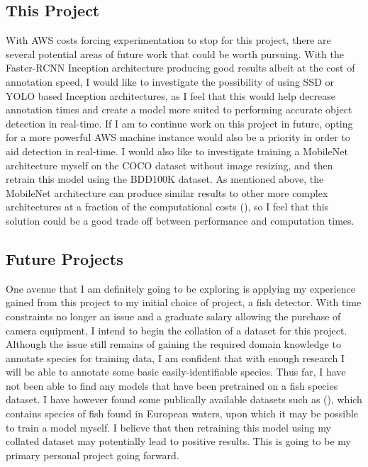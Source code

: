 \documentclass[12pt]{report}
\begin{document}
\subsection*{This Project}
\begin{flushleft}
With AWS costs forcing experimentation to stop for this project, there are several potential areas of future work that could be worth pursuing. With the Faster-RCNN Inception architecture producing good results albeit at the cost of annotation speed, I would like to investigate the possibility of using SSD or YOLO based Inception architectures, as I feel that this would help decrease annotation times and create a model more suited to performing accurate object detection in real-time. If I am to continue work on this project in future, opting for a more powerful AWS machine instance would also be a priority in order to aid detection in real-time. I would also like to investigate training a MobileNet architecture myself on the COCO dataset without image resizing, and then retrain this model using the BDD100K dataset. As mentioned above, the MobileNet architecture can produce similar results to other more complex architectures at a fraction of the computational costs (\cite{howard2017mobilenets}), so I feel that this solution could be a good trade off between performance and computation times.
\end{flushleft}

\subsection*{Future Projects}
\begin{flushleft}
One avenue that I am definitely going to be exploring is applying my experience gained from this project to my initial choice of project, a fish detector. With time constraints no longer an issue and a graduate salary allowing the purchase of camera equipment, I intend to begin the collation of a dataset for this project. Although the issue still remains of gaining the required domain knowledge to annotate species for training data, I am confident that with enough research I will be able to annotate some basic easily-identifiable species. Thus far, I have not been able to find any models that have been pretrained on a fish species dataset. I have however found some publically available datasets such as (\cite{fish}), which contains species of fish found in European waters, upon which it may be possible to train a model myself. I believe that then retraining this model using my collated dataset may potentially lead to positive results. This is going to be my primary personal project going forward.
\end{flushleft}
\end{document}
